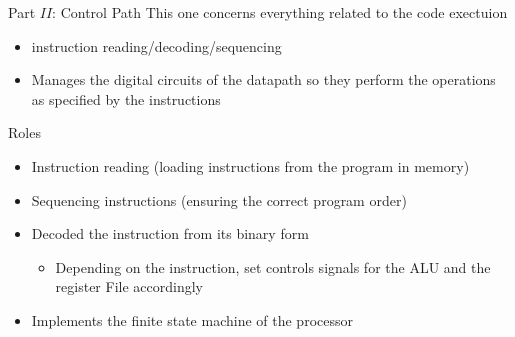 \begin{parag}{Part $II$: Control Path}
        This one concerns everything related to the code exectuion
        \begin{itemize}
            \item instruction reading/decoding/sequencing
            \item  Manages the digital circuits of the datapath so they perform the operations as specified by the instructions
        \end{itemize}
        \begin{subparag}{Roles}
            \begin{itemize}
                \item Instruction reading (loading instructions from the program in memory)
                \item Sequencing instructions (ensuring the correct program order)
                \item Decoded the instruction from its binary form
                \begin{itemize}
                    \item Depending on the instruction, set controls signals for the ALU and the register File accordingly
                \end{itemize}
            \item Implements the finite state machine of the processor
            \end{itemize}
            
        \end{subparag}
        
        
\end{parag}

